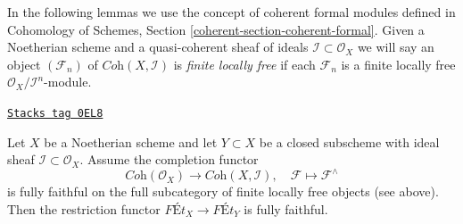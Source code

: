 \medskip\noindent
In the following lemmas we use the concept of coherent formal modules
defined in
Cohomology of Schemes, Section \ref{coherent-section-coherent-formal}.
Given a Noetherian scheme and a quasi-coherent sheaf of ideals
$\mathcal{I} \subset \mathcal{O}_X$ we will say
an object $(\mathcal{F}_n)$ of $\textit{Coh}(X, \mathcal{I})$
is {\it finite locally free} if each $\mathcal{F}_n$ is a finite
locally free $\mathcal{O}_X/\mathcal{I}^n$-module.

\begin{lemma}
\label{pione-lemma-restriction-fully-faithful}
\href{https://stacks.math.columbia.edu/tag/0EL8}{\texttt{Stacks tag 0EL8}}

Let $X$ be a Noetherian scheme and let $Y \subset X$ be a closed subscheme
with ideal sheaf $\mathcal{I} \subset \mathcal{O}_X$.
Assume the completion functor
$$
\textit{Coh}(\mathcal{O}_X)
\longrightarrow
\textit{Coh}(X, \mathcal{I}),\quad
\mathcal{F} \longmapsto \mathcal{F}^\wedge
$$
is fully faithful on the full subcategory of finite locally free objects
(see above).
Then the restriction functor $\textit{F\'Et}_X \to \textit{F\'Et}_Y$
is fully faithful.
\end{lemma}

